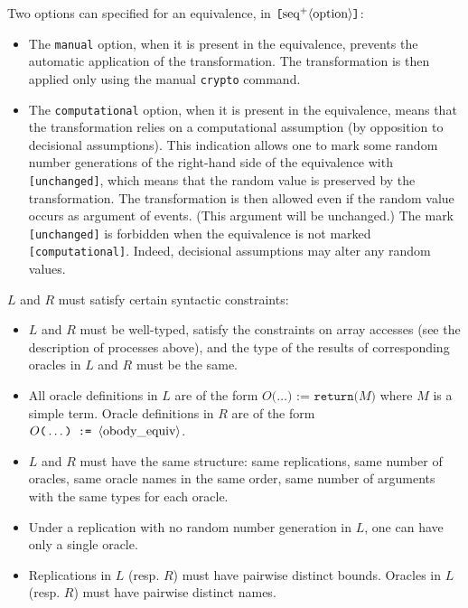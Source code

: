 \begin{itemize}
Two options can specified for an equivalence, in
$\texttt{[}\textrm{seq}^+\langle\textrm{option}\rangle\texttt{]}$:
\begin{itemize}

\item The \texttt{manual} option, when it is present in the equivalence,
prevents the automatic application of the transformation. The transformation
is then applied only using the manual \texttt{crypto} command.

\item The \texttt{computational} option, when it is present in the 
equivalence, means that the transformation relies on a computational assumption
(by opposition to decisional assumptions). This indication allows one to mark
some random number generations of the right-hand side of the equivalence with
\texttt{[unchanged]}, which means that the random value is preserved by 
the transformation. The transformation is then allowed even if the random 
value occurs as argument of events. (This argument will be unchanged.)
The mark \texttt{[unchanged]} is forbidden when the equivalence is
not marked \texttt{[computational]}. Indeed, decisional assumptions may
alter any random values.

\end{itemize}

$L$ and $R$ must satisfy certain syntactic constraints:
\begin{itemize}

\item %
$L$ and $R$ must be well-typed, satisfy the constraints on
array accesses (see the description of processes above), 
and the type of the results of 
corresponding oracles in $L$ and $R$ must be the same.

\item All oracle definitions in $L$ are of the form 
$O\texttt{(}\ldots\texttt{) := return(}M\texttt{)}$
where $M$ is a simple term. %
Oracle definitions in $R$ are of the form 
$O\texttt{(}\ldots\texttt{) := }\langle\textrm{obody\_equiv}\rangle$.

\item $L$ and $R$ must have the same structure: same replications,
same number of oracles, same oracle names in the same order,
same number of arguments with the same types for each oracle.

\item Under a replication with no random number generation in $L$, 
one can have only a single oracle.

\item Replications in $L$ (resp. $R$) must have pairwise distinct
bounds. Oracles in $L$ (resp. $R$) must have pairwise distinct names.


\end{itemize}
\end{itemize}

